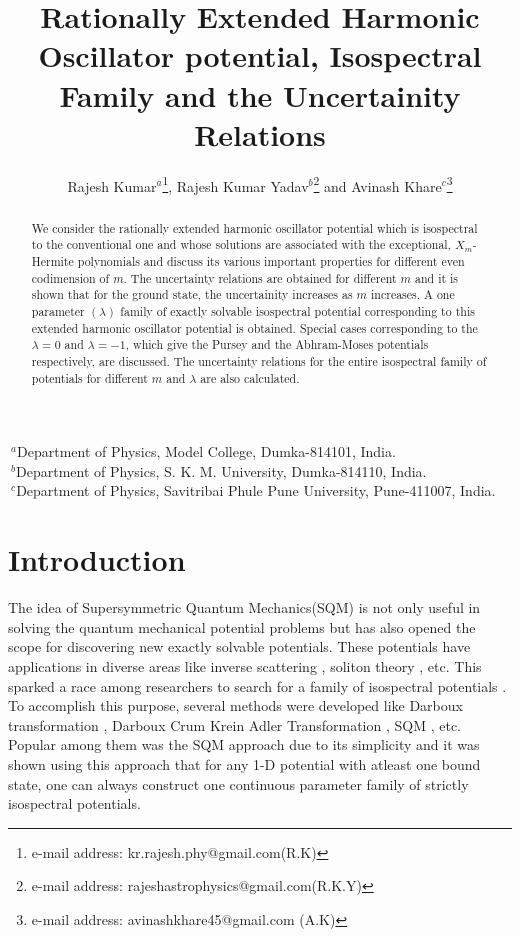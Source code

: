 \documentclass[11pt]{article}
\begin{document}
\title{Rationally Extended Harmonic Oscillator potential, Isospectral Family
and the Uncertainity Relations}
	
\author{Rajesh Kumar$^{a}$\footnote{e-mail address: kr.rajesh.phy@gmail.com(R.K)}, Rajesh Kumar Yadav$^{b}$\footnote{e-mail address: rajeshastrophysics@gmail.com(R.K.Y)} and 
Avinash Khare$^{c}$\footnote {e-mail address: avinashkhare45@gmail.com (A.K)}}
 \maketitle
 
{$~^a$Department of Physics, Model College, Dumka-814101, India.\\
$~^b$Department of Physics, S. K. M. University, Dumka-814110, India.\\
$~^c$Department of Physics, Savitribai Phule Pune University, Pune-411007, India. }

\begin{abstract}
We consider the rationally extended harmonic oscillator potential which is 
isospectral to the conventional one and whose solutions are associated with the
exceptional, \(X_m\)- Hermite polynomials and discuss its various important 
properties for different even codimension of $m$. The uncertainty relations are
obtained for different \( m \) and it is shown that for the ground state, the 
uncertainity increases as \(m\) increases.
 A one parameter $(\lambda)$ family  of exactly solvable isospectral potential 
corresponding to this extended harmonic oscillator potential is obtained. 
Special cases corresponding to the $\lambda=0$ and $\lambda = -1$, which give 
the Pursey and the Abhram-Moses potentials respectively, are discussed. The 
uncertainty relations for the entire isospectral family of potentials for different $m$ and $\lambda$ are also calculated.
\end{abstract}




\section{Introduction}
The idea of Supersymmetric Quantum Mechanics(SQM) 
\cite{cooper1995supersymmetry} is not only useful in solving the quantum 
mechanical potential problems but has also opened the scope for discovering new
exactly solvable potentials. These potentials have applications in diverse 
areas like inverse scattering \cite{agranovich2020inverse, chadan2012inverse}, 
soliton theory \cite{lamb1980elements, drazin1989solitons}, etc. This sparked a
race among researchers to search for a family of isospectral potentials 
\cite{nieto1984relationship, amado1988phase, pursey1986isometric, 
abraham1980changes}. To accomplish this purpose, several methods were developed
like Darboux transformation \cite{darboux1999proposition}, Darboux Crum Krein 
Adler Transformation \cite{odake2013krein}, SQM \cite{khare1989phase, 
keung1989families}, etc. Popular among them was the SQM approach due to its 
simplicity and it was shown using this approach that for any 1-D potential with 
atleast one bound state, one can always construct one continuous parameter 
family of strictly isospectral potentials.
\end{document}
